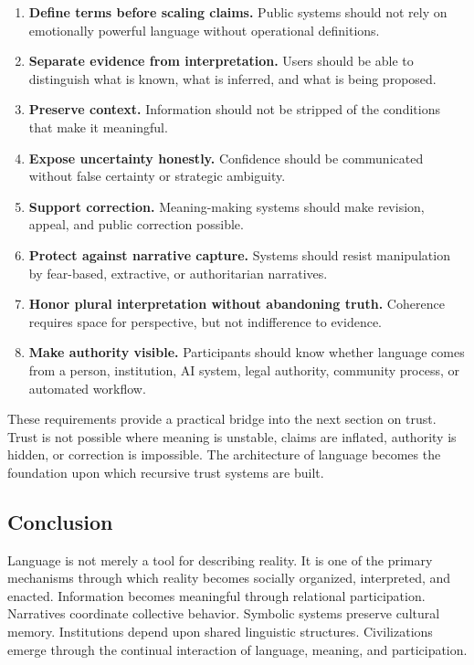 \documentclass[12pt]{article}
\begin{document}
\begin{enumerate}
  \item \textbf{Define terms before scaling claims.} Public systems should not rely on emotionally powerful language without operational definitions.
  \item \textbf{Separate evidence from interpretation.} Users should be able to distinguish what is known, what is inferred, and what is being proposed.
  \item \textbf{Preserve context.} Information should not be stripped of the conditions that make it meaningful.
  \item \textbf{Expose uncertainty honestly.} Confidence should be communicated without false certainty or strategic ambiguity.
  \item \textbf{Support correction.} Meaning-making systems should make revision, appeal, and public correction possible.
  \item \textbf{Protect against narrative capture.} Systems should resist manipulation by fear-based, extractive, or authoritarian narratives.
  \item \textbf{Honor plural interpretation without abandoning truth.} Coherence requires space for perspective, but not indifference to evidence.
  \item \textbf{Make authority visible.} Participants should know whether language comes from a person, institution, AI system, legal authority, community process, or automated workflow.
\end{enumerate}

These requirements provide a practical bridge into the next section on trust. Trust is not possible where meaning is unstable, claims are inflated, authority is hidden, or correction is impossible. The architecture of language becomes the foundation upon which recursive trust systems are built.

\subsection{Conclusion}

Language is not merely a tool for describing reality. It is one of the primary mechanisms through which reality becomes socially organized, interpreted, and enacted. Information becomes meaningful through relational participation. Narratives coordinate collective behavior. Symbolic systems preserve cultural memory. Institutions depend upon shared linguistic structures. Civilizations emerge through the continual interaction of language, meaning, and participation.
\end{document}
